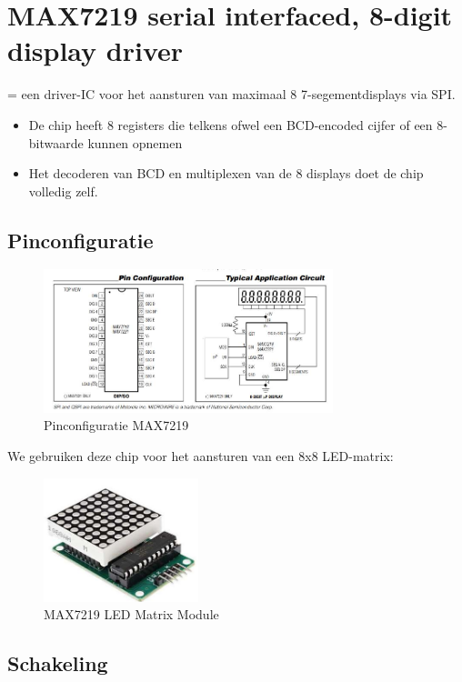\documentclass{article}
\begin{document}
\section{MAX7219 serial interfaced, 8-digit display driver}
= een driver-IC voor het aansturen van maximaal 8 7-segementdisplays via SPI. 

\begin{itemize}
    \item De chip heeft 8 registers die telkens ofwel een BCD-encoded cijfer of een 8-bitwaarde kunnen opnemen
    \item Het decoderen van BCD en multiplexen van de 8 displays doet de chip volledig zelf.
\end{itemize}

\subsection{Pinconfiguratie}
\begin{figure}[H]
    \centering
    \includegraphics[width=0.75\textwidth]{max7219-pins.png}
    \caption{Pinconfiguratie MAX7219}
\end{figure}

We gebruiken deze chip voor het aansturen van een 8x8 LED-matrix:

\begin{figure}[H]
    \centering
    \includegraphics[width=0.4\textwidth]{matrix.png}
    \caption{MAX7219 LED Matrix Module}
\end{figure}

\subsection{Schakeling}
\end{document}
